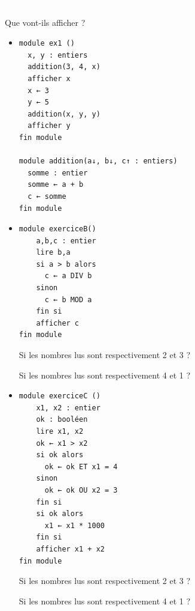 \documentclass[11pt,a4paper]{article}
\begin{document}
                \textcolor{white}{.} \par
            
							  Que vont-ils afficher ?
              
					\begin{itemize}
				
			\item \begin{verbatim}
module ex1 ()
  x, y : entiers
  addition(3, 4, x)
  afficher x
  x ← 3
  y ← 5
  addition(x, y, y)
  afficher y
fin module

module addition(a↓, b↓, c↑ : entiers)
  somme : entier
  somme ← a + b
  c ← somme
fin module
				\end{verbatim} \textcolor{gray}{\underline{\hspace*{1em}}}  \textcolor{gray}{\underline{\hspace*{1em}}} 
			\item \begin{verbatim}
module exerciceB()
    a,b,c : entier
    lire b,a
    si a > b alors
      c ← a DIV b
    sinon
      c ← b MOD a
    fin si
    afficher c
fin module
				\end{verbatim}Si les nombres lus sont respectivement 2 et 3 ? 
            \par
         \textcolor{gray}{\underline{\hspace*{1em}}} Si les nombres lus sont respectivement 4 et 1 ? 
            \par
         \textcolor{gray}{\underline{\hspace*{1em}}} 
			\item \begin{verbatim}
module exerciceC ()
    x1, x2 : entier
    ok : booléen
    lire x1, x2
    ok ← x1 > x2
    si ok alors
      ok ← ok ET x1 = 4
    sinon
      ok ← ok OU x2 = 3
    fin si
    si ok alors
      x1 ← x1 * 1000
    fin si
    afficher x1 + x2
fin module
				\end{verbatim}Si les nombres lus sont respectivement 2 et 3 ? 
            \par
         \textcolor{gray}{\underline{\hspace*{3em}}} Si les nombres lus sont respectivement 4 et 1 ? 
            \par
         \textcolor{gray}{\underline{\hspace*{3em}}} 
					\end{itemize}
				
            \par
\end{document}
